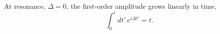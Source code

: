 \documentclass{article}
\begin{document}
At resonance, $\Delta = 0$, the first-order amplitude grows linearly in time,
\begin{equation}
\int_0^{t} dt'\, e^{i\Delta t'} = t .
\label{eq:res}
\end{equation}
\end{document}
